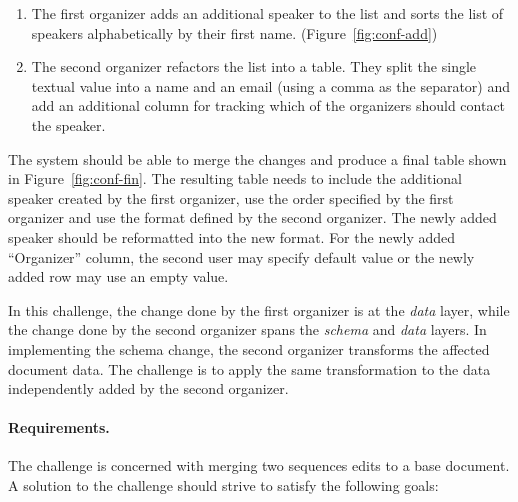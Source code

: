 \documentclass[english,submission]{programming}
\DeclareRobustCommand{\frameworkbox}[2][gray!15]{
\begin{tcolorbox}[breakable,left=3pt,right=3pt,top=3pt,bottom=3pt,colback=#1,colframe=#1,parbox=false,
  width=\dimexpr\textwidth\relax,enlarge left by=0mm,boxsep=5pt,arc=0pt,enlarge top by=0.5em,%
  outer arc=0pt]\setlength{\parskip}{0.5em}\setlength{\parindent}{0em}{\firamedium Framework perspective.}\quad #2
\end{tcolorbox}}
\begin{document}
\begin{enumerate}
\item The first organizer adds an additional speaker to the list and sorts the list of speakers
  alphabetically by their first name. (Figure~\ref{fig:conf-add})
\item The second organizer refactors the list into a table. They split the single textual value
  into a name and an email (using a comma as the separator) and add an additional column for
  tracking which of the organizers should contact the speaker.
\end{enumerate}

\noindent
The system should be able to merge the changes and produce a final table shown in
Figure~\ref{fig:conf-fin}. The resulting table needs to include the additional speaker
created by the first organizer, use the order specified by the first organizer and use
the format defined by the second organizer. The newly added speaker should be reformatted
into the new format. For the newly added ``Organizer'' column, the second user may
specify default value or the newly added row may use an empty value.

\frameworkbox{
In this challenge, the change done by the first organizer is at the \emph{data} layer,
while the change done by the second organizer spans the \emph{schema} and \emph{data} layers.
In implementing the schema change, the second organizer transforms the affected document data.
The challenge is to apply the same transformation to the data independently added by the
second organizer.
}

\paragraph{Requirements.}
The challenge is concerned with merging two sequences edits to a base document.
A solution to the challenge should strive to satisfy the following goals:
\end{document}
